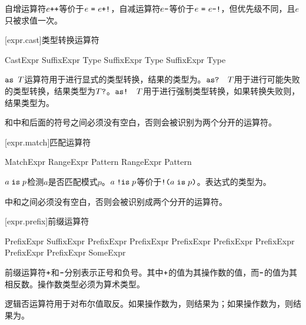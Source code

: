 \pnum
自增运算符$e\texttt{++}$等价于$e\ \texttt{=}\ e\texttt{+!}$，自减运算符$e\texttt{--}$等价于$e\ \tcode{=}\ e\tcode{-!}$，但优先级不同，且$e$只被求值一次。

[expr.cast]{类型转换运算符}

\begin{bnf}{CastExpr}
    SuffixExpr  Type \br
    SuffixExpr  Type \br
    SuffixExpr  Type
\end{bnf}

\pnum
$\texttt{as }T$运算符用于进行显式的类型转换，结果的类型为。$\texttt{as? }T$用于进行可能失败的类型转换，结果类型为$T\texttt{?}$。$\texttt{as! }T$用于进行强制类型转换，如果转换失败则，结果类型为。

\pnum
\enternote {}和中和后面的符号之间必须没有空白，否则会被识别为两个分开的运算符。\exitnote

[expr.match]{匹配运算符}

\begin{bnf}{MatchExpr}
    RangeExpr  Pattern \br
    RangeExpr  Pattern
\end{bnf}

\pnum
$a \mathrel{\texttt{is}} p$检测$a$是否匹配模式$p$。$a \mathrel{\texttt{!is}} p$等价于$\texttt{!(}a \mathrel{\texttt{is}} p\texttt{)}$。表达式的类型为。

\pnum
\enternote {}中\tcode{!}和之间必须没有空白，否则会被识别成两个分开的运算符。\exitnote

[expr.prefix]{前缀运算符}

\begin{bnf}{PrefixExpr}
    SuffixExpr \br
    \terminal{+} PrefixExpr \br
    \terminal{-} PrefixExpr \br
    \terminal{!} PrefixExpr \br
     PrefixExpr \br
    \terminal{\&} PrefixExpr \br
    \terminal{\&}  PrefixExpr \br
    \terminal{*} PrefixExpr \br
    SomeExpr
\end{bnf}

\pnum
前缀运算符$\mathbin{\texttt{+}}$和$\mathbin{\texttt{-}}$分别表示正号和负号。其中$\mathbin{\texttt{+}}$的值为其操作数的值，而$\mathbin{\texttt{-}}$的值为其相反数。操作数类型必须为算术类型。

\pnum
逻辑否运算符\tcode{!}用于对布尔值取反。如果操作数为，则结果为；如果操作数为，则结果为。

